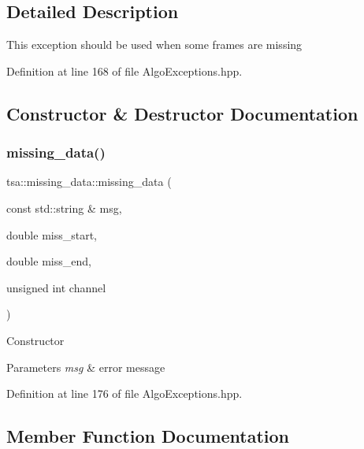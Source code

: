 \subsection{Detailed Description}
This exception should be used when some frames are missing 

Definition at line 168 of file Algo\+Exceptions.\+hpp.



\subsection{Constructor \& Destructor Documentation}
\mbox{\label{classtsa_1_1missing__data_a8d5ae46c22478ec86fae022f0044d2b7}} 
\subsubsection{\texorpdfstring{missing\+\_\+data()}{missing\_data()}}
{\footnotesize\ttfamily tsa\+::missing\+\_\+data\+::missing\+\_\+data (\begin{DoxyParamCaption}\item[{const std\+::string \&}]{msg,  }\item[{double}]{miss\+\_\+start,  }\item[{double}]{miss\+\_\+end,  }\item[{unsigned int}]{channel }\end{DoxyParamCaption})\hspace{0.3cm}{\ttfamily [inline]}}

Constructor


\begin{DoxyParams}{Parameters}
{\em msg} & error message \\
\hline
\end{DoxyParams}


Definition at line 176 of file Algo\+Exceptions.\+hpp.



\subsection{Member Function Documentation}
\mbox{\label{classtsa_1_1missing__data_a96f7fd1c113289c1cfd22117fda3ec83}} 
